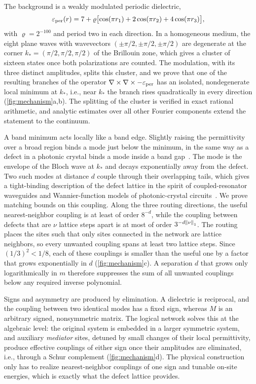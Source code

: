 The background is a weakly modulated periodic dielectric,
\begin{equation}
 \varepsilon_{\rm per}(r)=7+\varrho
 \bigl[\cos(\pi r_1)+2\cos(\pi r_2)+4\cos(\pi r_3)\bigr],
 \label{eq:background}
\end{equation}
with $\varrho=2^{-100}$ and period two in each direction. In a
homogeneous medium, the eight plane waves with wavevectors
$(\pm\pi/2,\pm\pi/2,\pm\pi/2)$ are degenerate at the corner
$k_*=(\pi/2,\pi/2,\pi/2)$ of the Brillouin zone, which gives a cluster of
sixteen states once both polarizations are counted. The modulation, with its
three distinct amplitudes, splits this cluster, and we prove that one of the
resulting branches of the operator $\nabla\times\nabla\times-\varepsilon_{\rm per}$
has an isolated, nondegenerate local minimum at $k_*$, i.e., near $k_*$ the
branch rises quadratically in every direction (\cref{fig:mechanism}a,b). The
splitting of the cluster is verified in exact rational arithmetic, and
analytic estimates over all other Fourier components extend the statement to
the continuum.

A band minimum acts locally like a band edge. Slightly raising the
permittivity over a broad region binds a mode just below the minimum,
in the same way as a defect in a photonic crystal binds a mode inside a band
gap~\citep{figotinklein1997,figotinklein1998,Joannopoulos2008}. The mode is
the envelope of the Bloch wave at $k_*$ and decays exponentially away from
the defect. Two such modes at distance $d$ couple through their overlapping
tails, which gives a tight-binding description of the defect lattice in the
spirit of coupled-resonator waveguides and Wannier-function models of
photonic-crystal circuits~\citep{Yariv1999,Busch2003}. We prove matching
bounds on this coupling. Along the three routing directions, the useful
nearest-neighbor coupling is at least of order $8^{-d}$, while the coupling
between defects that are $\nu$ lattice steps apart is at most of order
$3^{-d\left\lVert \nu\right\rVert_1}$. The routing places the sites such that
only sites connected in the network are lattice neighbors, so every unwanted
coupling spans at least two lattice steps. Since $(1/3)^2<1/8$, each of these
couplings is smaller than the useful one by a factor that grows exponentially
in $d$ (\cref{fig:mechanism}c). A separation $d$ that grows
only logarithmically in $m$ therefore suppresses the sum of all unwanted
couplings below any required inverse polynomial.

Signs and asymmetry are produced by elimination. A dielectric is reciprocal,
and the coupling between two identical modes has a fixed sign, whereas $M$ is
an arbitrary signed, nonsymmetric matrix. The logical network solves this at
the algebraic level: the original system is embedded in a larger symmetric
system, and auxiliary \emph{mediator} sites, detuned by small changes of their
local permittivity, produce effective couplings of either sign once their
amplitudes are eliminated, i.e., through a Schur complement (\cref{fig:mechanism}d). The physical
construction only has to realize nearest-neighbor couplings of one sign and
tunable on-site energies, which is exactly what the defect lattice provides.

